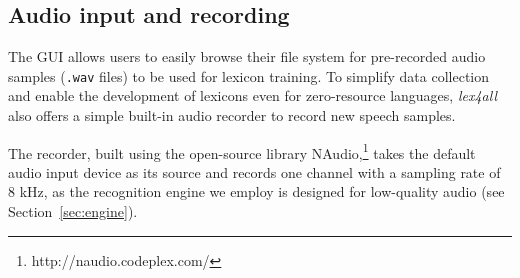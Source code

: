 \documentclass[11pt]{article}
\begin{document}
\subsection{Audio input and recording}
\label{sec:recording}


The GUI allows users to easily browse their file system for pre-recorded audio samples (\texttt{.wav} files) to be used for lexicon training. 
To simplify data collection and enable the development of lexicons even for zero-resource languages, \textit{lex4all} also offers a simple built-in audio recorder to record new speech samples.

The recorder, 
built using the open-source library NAudio,\footnote{http://naudio.codeplex.com/}
takes the default audio input device as its %
source and records one channel with a sampling rate of 8 kHz, as
the recognition engine we employ is designed for low-quality audio 
(see Section~\ref{sec:engine}).

\end{document}
